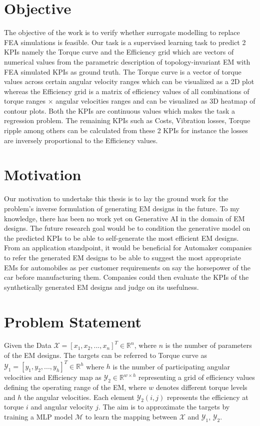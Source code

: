\documentclass{report} %
\begin{document}
\section{Objective}\label{sec:Objective}
The objective of the work is to verify whether surrogate modelling to replace \ac{FEA} simulations is feasible.
Our task is a supervised learning task to predict 2 KPIs namely the Torque curve and the Efficiency grid which are vectors of numerical values 	 
from the parametric description of topology-invariant \ac{EM} with \ac{FEA} simulated \ac{KPI}s as ground truth. 
The Torque curve is a vector of torque values across certain angular velocity ranges which can be visualized as a 2\ac{D} plot whereas the Efficiency grid is a matrix of 
efficiency values of all combinations of torque ranges $\times$ angular velocities ranges and can be visualized as 3\ac{D} heatmap of contour plots. 
Both the \ac{KPI}s are continuous values which makes the task a regression problem. 
The remaining \ac{KPI}s such as Costs, Vibration losses, Torque ripple among others can be calculated from these 2 \ac{KPI}s for instance the losses 
are inversely proportional to the Efficiency values.

\section{Motivation}\label{sec:Motivation}
Our motivation to undertake this thesis is to lay the ground work for the problem's inverse formulation of generating \ac{EM} designs in the future. To my knowledge, 
there has been no work yet on Generative AI in the domain of \ac{EM} designs. The future research goal would be to condition the generative model on the predicted 
\ac{KPI}s to be able to self-generate the most efficient \ac{EM} designs. From an application standpoint, it would be beneficial for Automaker companies to refer the 
generated \ac{EM} designs to be able to suggest the most appropriate \ac{EM}s for automobiles as per customer requirements on say the horsepower of the car before manufacturing them. 
Companies could then evaluate the \ac{KPI}s of the synthetically generated \ac{EM} designs and judge on its usefulness. 

\section{Problem Statement}\label{sec:Problem Statement}

Given the Data $\mathcal{X}  = [x_1, x_2, ..., x_{n}]^T \in \mathbb{R}^{n}$, where $n$ is the number of parameters of the \ac{EM} designs. 
The targets can be referred to Torque curve as $\mathcal{Y}_1 = [y_1, y_2, ..., y_{h}]^T \in \mathbb{R}^{h}$ where $h$ is the number of participating angular velocities and
Efficiency map as $\mathcal{Y}_2 \in \mathbb{R}^{w \times h}$ representing a grid of efficiency values defining the operating range of the \ac{EM}, where $w$ denotes 
different torque levels and $h$ the angular velocities. Each element $\mathcal{Y}_2(i,j)$ represents the efficiency at torque $i$ and angular velocity $j$.
The aim is to approximate the targets by training a \ac{MLP} model $\mathcal{M}$ to learn the mapping between $\mathcal{X}$ and $\mathcal{Y}_1$, $\mathcal{Y}_2$.
\end{document}
